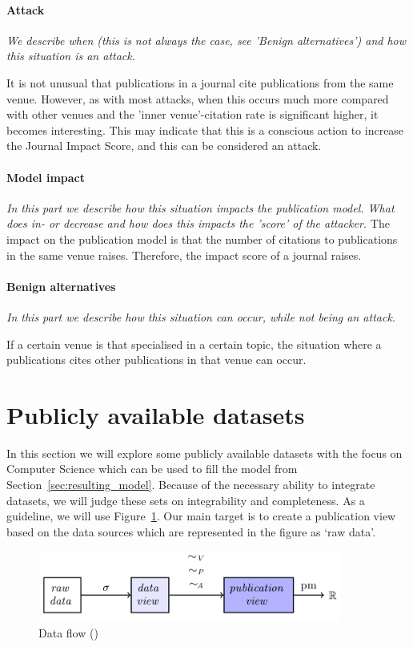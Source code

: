 \documentclass{ou-report}
\begin{document}
\paragraph{Attack}
\textit{We describe when (this is not always the case, see 'Benign 
alternatives') and how this situation is an attack.} 

It is not unusual that publications in a journal cite publications from the same
venue. However, as with most attacks, when this occurs much more compared with
other venues and the 'inner venue'-citation rate is significant higher, it
becomes interesting. This may indicate that this is a conscious action to
increase the Journal Impact Score, and this can be considered an attack.

\paragraph{Model impact}
\textit{In this part we describe how this situation impacts the publication 
model. What does in- or decrease and how does this impacts the 'score' 
of the attacker.}
The impact on the publication model is that the number of citations to 
publications in the same venue raises. Therefore, the impact score of a journal
raises. 

\paragraph{Benign alternatives}
\textit{In this part we describe how this situation can occur, while not being
an attack.} 

If a certain venue is that specialised in a certain topic, the 
situation where a publications cites other publications in that venue can occur.


\section{Publicly available datasets}
\label{sec:data_public_datasets}
In this section we will explore some publicly available datasets with the focus 
on Computer Science which can be used to fill the model from
Section~\ref{sec:resulting_model}. Because of the necessary ability to integrate
datasets, we will judge these sets on integrability and completeness.
As a guideline, we will use Figure~\ref{fig:dataflow_jm2017_a}. Our main target
is to create a publication view based on the data sources which are represented
in the figure as `raw data'.
\begin{figure}[H]
    \centering
    \includegraphics[width=10cm]{images/data_to_publication_metrics_jm2017.png}
    \caption{Data flow (\cite{JM2017})}
    \label{fig:dataflow_jm2017_a}
\end{figure}
\end{document}
